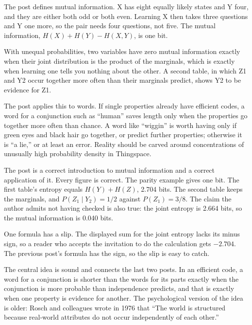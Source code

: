 \begin{afterword}
\summaryhead

The post defines mutual information. X has eight equally likely states and Y four, and they are either both odd or both even. Learning X then takes three questions and Y one more, so the pair needs four questions, not five. The mutual information, $H(X) + H(Y) - H(X,Y)$, is one bit.

With unequal probabilities, two variables have zero mutual information exactly when their joint distribution is the product of the marginals, which is exactly when learning one tells you nothing about the other. A second table, in which Z1 and Y2 occur together more often than their marginals predict, shows Y2 to be evidence for Z1.

The post applies this to words. If single properties already have efficient codes, a word for a conjunction such as ``human'' saves length only when the properties go together more often than chance. A word like ``wiggin'' is worth having only if green eyes and black hair go together, or predict further properties; otherwise it is ``a lie,'' or at least an error. Reality should be carved around concentrations of unusually high probability density in Thingspace.

\responsehead

The post is a correct introduction to mutual information and a correct application of it. Every figure is correct. The parity example gives one bit. The first table's entropy equals $H(Y) + H(Z)$, 2.704 bits. The second table keeps the marginals, and $P(Z_1 \mid Y_2) = 1/2$ against $P(Z_1) = 3/8$. The claim the author admits not having checked is also true: the joint entropy is 2.664 bits, so the mutual information is 0.040 bits.

One formula has a slip. The displayed sum for the joint entropy lacks its minus sign, so a reader who accepts the invitation to do the calculation gets $-2.704$. The previous post's formula has the sign, so the slip is easy to catch.

The central idea is sound and connects the last two posts. In an efficient code, a word for a conjunction is shorter than the words for its parts exactly when the conjunction is more probable than independence predicts, and that is exactly when one property is evidence for another. The psychological version of the idea is older: Rosch and colleagues wrote in 1976 that ``The world is structured because real-world attributes do not occur independently of each other.''


\end{afterword}
